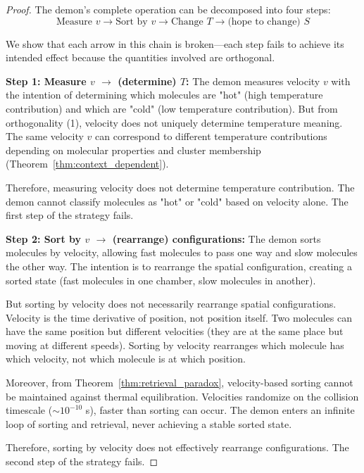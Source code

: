 \documentclass[12pt,a4paper]{article}
\theoremstyle{definition}
\theoremstyle{remark}
\begin{document}
\begin{proof}
The demon's complete operation can be decomposed into four steps:
\begin{equation}
\text{Measure } v \to \text{Sort by } v \to \text{Change } T \to \text{(hope to change) } S
\label{eq:demon_strategy}
\end{equation}

We show that each arrow in this chain is broken—each step fails to achieve its intended effect because the quantities involved are orthogonal.

\textbf{Step 1: Measure $v$ $\to$ (determine) $T$:}
The demon measures velocity $v$ with the intention of determining which molecules are "hot" (high temperature contribution) and which are "cold" (low temperature contribution). But from orthogonality (1), velocity does not uniquely determine temperature meaning. The same velocity $v$ can correspond to different temperature contributions depending on molecular properties and cluster membership (Theorem~\ref{thm:context_dependent}).

Therefore, measuring velocity does not determine temperature contribution. The demon cannot classify molecules as "hot" or "cold" based on velocity alone. The first step of the strategy fails.

\textbf{Step 2: Sort by $v$ $\to$ (rearrange) configurations:}
The demon sorts molecules by velocity, allowing fast molecules to pass one way and slow molecules the other way. The intention is to rearrange the spatial configuration, creating a sorted state (fast molecules in one chamber, slow molecules in another).

But sorting by velocity does not necessarily rearrange spatial configurations. Velocity is the time derivative of position, not position itself. Two molecules can have the same position but different velocities (they are at the same place but moving at different speeds). Sorting by velocity rearranges which molecule has which velocity, not which molecule is at which position.

Moreover, from Theorem~\ref{thm:retrieval_paradox}, velocity-based sorting cannot be maintained against thermal equilibration. Velocities randomize on the collision timescale ($\sim 10^{-10}$ s), faster than sorting can occur. The demon enters an infinite loop of sorting and retrieval, never achieving a stable sorted state.

Therefore, sorting by velocity does not effectively rearrange configurations. The second step of the strategy fails.


\end{proof}
\end{document}
